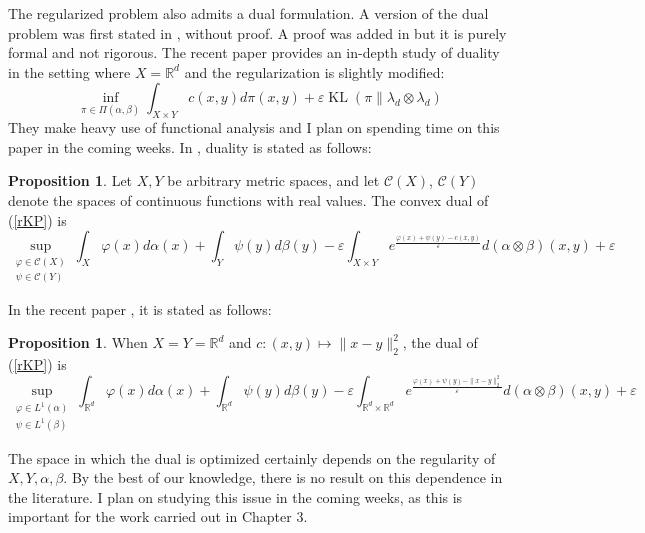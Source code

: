 \documentclass[12pt]{report}
\theoremstyle{definition}
\newtheorem{prop}[defi]{Proposition}
\theoremstyle{remark}
\DeclareMathOperator{\kl}{KL}
\begin{document}
The regularized problem also admits a dual formulation. A version of the dual problem was first stated in \cite{genevay2016stochastic}, without proof. A proof was added in \cite[Proposition~4]{genevay2019entropy} but it is purely formal and not rigorous. The recent paper \cite{clason2019entropic} provides an in-depth study of duality in the setting where $X=\mathbb R^d$ and the regularization is slightly modified:
	\begin{equation*}
	\inf_{\pi\in \Pi(\alpha, \beta)} \int_{X\times Y} c(x,y) d\pi(x,y) + \varepsilon\kl(\pi\|\lambda_d\otimes \lambda_d)
	\end{equation*}
They make heavy use of functional analysis and I plan on spending time on this paper in the coming weeks. In \cite{genevay2016stochastic,genevay2018sample,genevay2019entropy}, duality is stated as follows:

\begin{prop}
	Let $X,Y$ be arbitrary metric spaces, and let $\mathcal C(X)$, $\mathcal C(Y)$ denote the spaces of continuous functions with real values. The convex dual of (\ref{rKP}) is 
	\begin{equation*}\tag{Dual Reg. KP 1}\label{dualrKP}
		\sup_{\substack{\varphi \in \mathcal C(X)\\\psi \in \mathcal C(Y)}} \int_X \varphi(x) d\alpha(x) + \int_Y \psi(y) d\beta(y) -\varepsilon \int_{X\times Y} e^{\frac{\varphi(x)+\psi(y)-c(x,y)}\varepsilon} d(\alpha\otimes\beta)(x,y) + \varepsilon
	\end{equation*}
\end{prop}

In the recent paper \cite{mena2019statistical}, it is stated as follows:

\begin{prop}
	When $X=Y=\mathbb R^d$ and $c:(x,y)\mapsto \|x-y\|_2^2$, the dual of (\ref{rKP}) is 
	\begin{equation*}\tag{Dual Reg. KP 2}\label{dualrKP2}
		\sup_{\substack{\varphi \in L^1(\alpha)\\\psi \in L^1(\beta)}} \int_{\mathbb R^d} \varphi(x) d\alpha(x) + \int_{\mathbb R^d} \psi(y) d\beta(y) -\varepsilon \int_{\mathbb R^d\times \mathbb R^d} e^{\frac{\varphi(x)+\psi(y)-\|x-y\|_2^2}\varepsilon} d(\alpha\otimes\beta)(x,y) + \varepsilon
	\end{equation*}
\end{prop}

The space in which the dual is optimized certainly depends on the regularity of $X,Y, \alpha, \beta$. By the best of our knowledge, there is no result on this dependence in the literature. I plan on studying this issue in the coming weeks, as this is important for the work carried out in Chapter 3.
\end{document}
